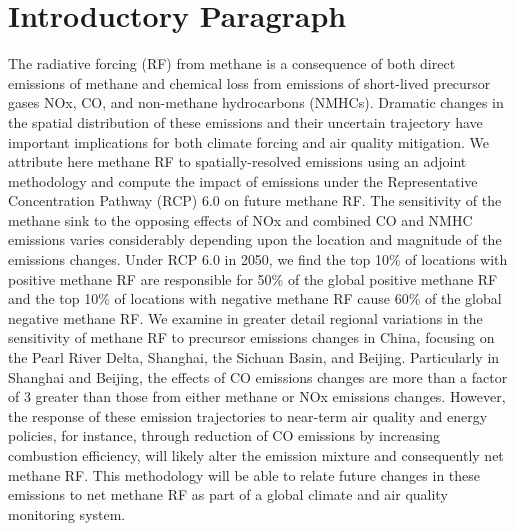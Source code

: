 \section*{Introductory Paragraph}

The radiative forcing (RF) from methane is a consequence of both direct emissions of methane and chemical loss from emissions of short-lived precursor gases NOx, CO, and non-methane hydrocarbons (NMHCs). Dramatic changes in the spatial distribution of these emissions and their uncertain trajectory have important implications for both climate forcing and air quality mitigation.  We attribute here methane RF to spatially-resolved emissions using an adjoint methodology and compute the impact of emissions under the Representative Concentration Pathway (RCP) 6.0 on future methane RF. The sensitivity of the methane sink to the opposing effects of NOx and combined CO and NMHC emissions varies considerably depending upon the location and magnitude of the emissions changes. Under RCP 6.0 in 2050, we find the top 10\% of locations with positive methane RF are responsible for 50\% of the global positive methane RF and the top 10\% of locations with negative methane RF cause 60\% of the global negative methane RF. We examine in greater detail regional variations in the sensitivity of methane RF to precursor emissions changes in China, focusing on the Pearl River Delta, Shanghai, the Sichuan Basin, and Beijing. Particularly in Shanghai and Beijing, the effects of CO emissions changes are more than a factor of 3 greater than those from either methane or NOx emissions changes. However, the response of these emission trajectories to near-term air quality and energy policies, for instance, through reduction of CO emissions by increasing combustion efficiency, will likely alter the emission mixture and consequently net methane RF. This methodology will be able to relate future changes in these emissions to net methane RF as part of a global climate and air quality monitoring system. 